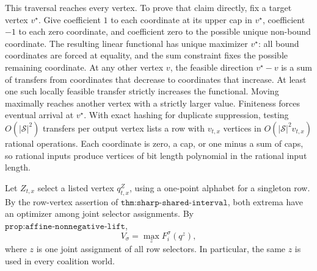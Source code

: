 This traversal reaches every vertex.  To prove that claim directly, fix a target vertex \(v^\star\).  Give coefficient \(1\) to each coordinate at its upper cap in \(v^\star\), coefficient \(-1\) to each zero coordinate, and coefficient zero to the possible unique non-bound coordinate.  The resulting linear functional has unique maximizer \(v^\star\): all bound coordinates are forced at equality, and the sum constraint fixes the possible remaining coordinate.  At any other vertex \(v\), the feasible direction \(v^\star-v\) is a sum of transfers from coordinates that decrease to coordinates that increase.  At least one such locally feasible transfer strictly increases the functional.  Moving maximally reaches another vertex with a strictly larger value.  Finiteness forces eventual arrival at \(v^\star\).  With exact hashing for duplicate suppression, testing \(O(|\mathcal S|^2)\) transfers per output vertex lists a row with \(v_{t,x}\) vertices in \(O(|\mathcal S|^2v_{t,x})\) rational operations.  Each coordinate is zero, a cap, or one minus a sum of caps, so rational inputs produce vertices of bit length polynomial in the rational input length.

Let \(Z_{t,x}\) select a listed vertex \(q^Z_{t,x}\), using a one-point alphabet for a singleton row.  By the row-vertex assertion of \(\texttt{thm:sharp-shared-interval}\), both extrema have an optimizer among joint selector assignments.  By \(\texttt{prop:affine-nonnegative-lift}\),
\[
 V_\sigma=\max_z F_i^\sigma(q^z),
 \tag{2}
\]
where \(z\) is one joint assignment of all row selectors.  In particular, the same \(z\) is used in every coalition world.

